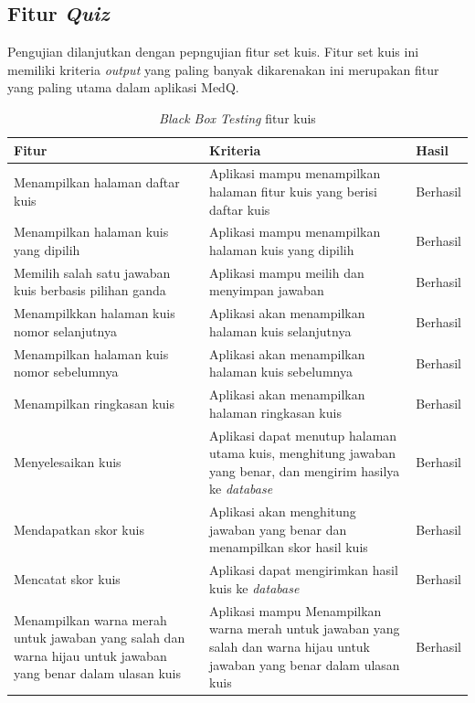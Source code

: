 \subsection{Fitur \textit{Quiz}}
Pengujian dilanjutkan dengan pepngujian fitur set kuis. Fitur set kuis ini memiliki kriteria \textit{output} yang paling banyak dikarenakan ini merupakan fitur yang paling utama dalam aplikasi MedQ.
\begin{table}[H]
	\caption{\textit{Black Box Testing} fitur kuis}
	\label{Tab:blackBoxKuis}
	\begin{tabular}{|p{}|p{}|p{}|}
		\hline
		 \centering\textbf{Fitur} & \multicolumn{1}{m{0.45\textwidth}|}{\centering \textbf{Kriteria}}&  \multicolumn{1}{m{0.1\textwidth}|}{\centering \textbf{Hasil}}\\
		\hline
		Menampilkan halaman daftar kuis
		&  Aplikasi mampu menampilkan halaman fitur kuis yang berisi daftar kuis
		& Berhasil\\
		\hline
		Menampilkan halaman kuis yang dipilih
		& Aplikasi mampu menampilkan halaman kuis yang dipilih 
		& Berhasil\\
		\hline
		Memilih salah satu jawaban kuis berbasis pilihan ganda
		& Aplikasi mampu meilih dan menyimpan jawaban 
		& Berhasil\\
		\hline
		Menampilkkan halaman kuis nomor selanjutnya
		& Aplikasi akan menampilkan halaman kuis selanjutnya
		& Berhasil\\
		\hline
		Menampilkan halaman kuis nomor sebelumnya
		& Aplikasi akan menampilkan halaman kuis sebelumnya 
		& Berhasil\\
		\hline
		Menampilkan ringkasan kuis
		& Aplikasi akan menampilkan halaman ringkasan kuis 
		& Berhasil\\
		\hline
		Menyelesaikan kuis
		& Aplikasi dapat menutup halaman utama kuis, menghitung jawaban yang benar, dan mengirim hasilya ke \textit{database}
		& Berhasil\\
		\hline
		Mendapatkan skor kuis
		& Aplikasi akan  menghitung jawaban yang benar dan menampilkan skor hasil kuis
		& Berhasil\\
		\hline
		Mencatat skor kuis
		& Aplikasi dapat mengirimkan hasil kuis ke \textit{database}
		& Berhasil\\
		\hline
		Menampilkan warna merah untuk jawaban yang salah dan warna hijau untuk jawaban yang benar dalam ulasan kuis
		& Aplikasi mampu Menampilkan warna merah untuk jawaban yang salah dan warna hijau untuk jawaban yang benar dalam ulasan kuis 
		& Berhasil\\
		\hline
	\end{tabular}
\end{table}
